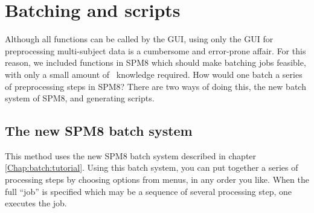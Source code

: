 \section{Batching and scripts}
Although all functions can be called by the GUI, using only the GUI for preprocessing multi-subject data is a cumbersome and error-prone affair. For this reason, we included functions in SPM8 which should make batching jobs feasible, with only a small amount of \matlab\ knowledge required. How would one batch a series of preprocessing steps in SPM8? There are two ways of doing this, the new batch system of SPM8, and generating scripts.

\subsection{The new SPM8 batch system}
This method uses the new SPM8 batch system described in chapter \ref{Chap:batch:tutorial}. Using this batch system, you can put together a series of processing steps by choosing options from menus, in any order you like. When the full ``job'' is specified which may be a sequence of several processing step, one executes the job.


